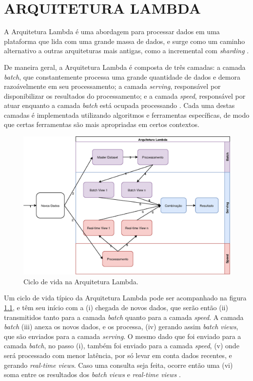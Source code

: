 \chapter[ARQUITETURA LAMBDA]{ARQUITETURA LAMBDA}

A Arquitetura Lambda é uma abordagem para processar dados em uma plataforma
que lida com uma grande massa de dados, e surge como um caminho alternativo
a outras arquiteturas mais antigas, como a incremental com \textit{sharding}
\cite{marz2015}.

De maneira geral, a Arquitetura Lambda é composta de três camadas: a camada
\textit{batch}, que constantemente processa uma grande quantidade de dados e
demora razoávelmente em seu processamento; a camada \textit{serving},
responsável por disponibilizar os resultados do processamento; e a camada
\textit{speed}, responsável por atuar enquanto a camada \textit{batch} está
ocupada processando \cite{marz2015}. Cada uma destas camadas é implementada
utilizando algoritmos e ferramentas específicas, de modo que certas ferramentas
são mais apropriadas em certos contextos.

\begin{figure}
  \centering
    \includegraphics[width=\textwidth]{figuras/lambda-lifecycle.eps}
  \caption{Ciclo de vida na Arquitetura Lambda.}
  \label{fig:lambda-lifecycle}
\end{figure}

Um ciclo de vida típico da Arquitetura Lambda pode ser acompanhado na figura
\ref{fig:lambda-lifecycle}, e têm seu início com a (i) chegada
de novos dados, que serão então (ii) transmitidos tanto para a camada
\textit{batch} quanto para a camada \textit{speed}. A camada \textit{batch}
(iii) anexa os novos dados, e os processa, (iv) gerando assim
\textit{batch views}, que são enviados para a camada \textit{serving}. O mesmo
dado que foi enviado para a camada \textit{batch}, no passo (i), também foi
enviado para a camada \textit{speed}, (v) onde será processado com menor latência,
por só levar em conta dados recentes, e gerando \textit{real-time views}. 
Caso uma consulta seja feita, ocorre então uma (vi) soma entre os resultados
dos \textit{batch views} e \textit{real-time views} \cite{marz2015}.

